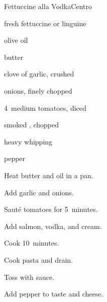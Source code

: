 \begin{recipe}{Fettuccine alla Vodka}{Centro}{}

\begin{ingredients}
\item {} fresh fettuccine or linguine
\item {} olive oil
\item {} butter
\item clove of garlic, crushed
\item {} onions, finely chopped
\item 4~medium tomatoes, diced
\item {} smoked , chopped
\item {} 
\item {} heavy whipping 
\item pepper
\item \C{\quarter} 
\end{ingredients}

\begin{directions}
\item Heat butter and oil in a pan.
\item Add garlic and onions.
\item Sauté tomatoes for 5~minutes.
\item Add salmon, vodka, and cream.
\item Cook 10~minutes.
\item Cook pasta and drain.
\item Toss with sauce.
\item Add pepper to taste and cheese.
\end{directions}

\end{recipe}
